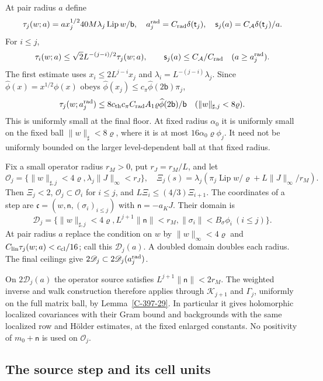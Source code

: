 \documentclass[11pt,letterpaper,reqno]{amsart}
\theoremstyle{definition}
\theoremstyle{remark}
\begin{document}
At pair radius $a$ define
\[
 \tau_j(w;a)=a x_j^{1/2}40M\lambda_j\operatorname{Lip}w/\mathsf b,
 \quad a_j^{\rm rad}=C_{\rm rad}\delta(\mathsf t_j),\quad
 \mathsf s_j(a)=C_{\mathcal A}\delta(\mathsf t_j)/a.
\]
For $i\le j$,
\begin{equation}\label{eq:qcd-source-radius-lag}
 \tau_i(w;a)\le\sqrt2L^{-(j-i)/2}\tau_j(w;a),\qquad
 \mathsf s_j(a)\le C_{\mathcal A}/C_{\rm rad}\quad(a\ge a_j^{\rm rad}).
\end{equation}
The first estimate uses $x_i\le2L^{j-i}x_j$ and
$\lambda_i=L^{-(j-i)}\lambda_j$.
Since $\widehat\phi(x)=x^{1/2}\phi(x)$ obeys
$\widehat\phi(x_j)\le c_\pi\widehat\phi(2\mathsf b)\pi_j$,
\[
 \tau_j(w;a_j^{\rm rad})\le
 8c_{\rm th}c_\pi C_{\rm rad}A_1\varrho
                       \widehat\phi(2\mathsf b)/\mathsf b
 \quad(\|w\|_{\sharp,j}<8\varrho).
\]
This is uniformly small at the final floor. At fixed radius
$\alpha_0$ it is uniformly small on the fixed ball
$\|w\|_\sharp<8\varrho$, where it is at most
$16\alpha_0\varrho\phi_j$. It need not be uniformly bounded
on the larger level-dependent ball at that fixed radius.

Fix a small operator radius $r_M>0$, put $r_J=r_M/L$, and let
\[
 \mathscr O_j=\{\|w\|_{\sharp,j}<4\varrho,
                    \lambda_j\|J\|_\infty<r_J\},\quad
 \Xi_j(s)=\lambda_j\left(
 \pi_j\operatorname{Lip}w/\varrho+L\|J\|_\infty/r_M\right).
\]
Then $\Xi_j<2$, $\mathscr O_j\subset\mathscr O_i$ for $i\le j$,
and $L\Xi_i\le(4/3)\Xi_{i+1}$.
The coordinates of a step are
$\mathfrak c=(w,\mathsf n,(\sigma_i)_{i\le j})$ with
$\mathsf n=-a_KJ$. Their domain is
\[
 \mathscr D_j=\{\|w\|_{\sharp,j}<4\varrho,
 L^{j+1}\|\mathsf n\|<r_M,
 \|\sigma_i\|<B_\sigma\phi_i\ (i\le j)\}.
\]
At pair radius $a$ replace the condition on $w$ by
$\|w\|_\infty<4\varrho$ and
$C_{\rm lin}\tau_j(w;a)<c_{\rm cl}/16$; call this
$\mathscr D_j(a)$. A doubled domain doubles each radius.
The final ceilings give
$2\mathscr D_j\subset2\mathscr D_j(a_j^{\rm rad})$.

On $2\mathscr D_j(a)$ the operator source satisfies
$L^{j+1}\|\mathsf n\|<2r_M$. The weighted inverse and walk
construction therefore applies through $\mathcal K_{j+1}$
and $\Gamma_j$, uniformly on the full matrix ball, by
Lemma~\ref{C-397-29}. In particular it gives holomorphic
localized covariances with their Gram bound and backgrounds
with the same localized row and H\"older estimates, at the
fixed enlarged constants. No positivity of
$m_0+\mathsf n$ is used on $\mathscr O_j$.

\subsection{The source step and its cell units}
\end{document}
